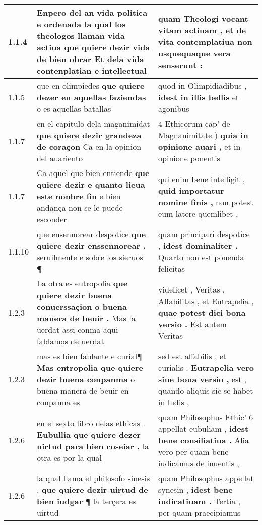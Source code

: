 \begin{tabular}{|p{1cm}|p{6.5cm}|p{6.5cm}|}

\hline
1.1.4 & Enpero del an vida politica e ordenada la qual los theologos llaman vida actiua \textbf{ que quiere dezir vida de bien obrar } Et dela vida contenplatian e intellectual & quam Theologi vocant vitam actiuam , \textbf{ et de vita contemplatiua } non usquequaque vera senserunt : \\\hline
1.1.5 & que en olimpiedes \textbf{ que quiere dezer en aquellas faziendas } o es aquellas batallas & quod in Olimpidiadibus , \textbf{ idest in illis bellis } et agonibus \\\hline
1.1.7 & en el capitulo dela maganimidat \textbf{ que quiere dezir grandeza de coraçon } Ca en la opinion del auariento & 4 Ethicorum cap’ de Magnanimitate ) \textbf{ quia in opinione auari , } et in opinione ponentis \\\hline
1.1.7 & Ca aquel que bien entiende \textbf{ que quiere dezir e quanto lieua este nonbre fin } e bien andança non se le puede esconder & qui enim bene intelligit , \textbf{ quid importatur nomine finis , } non potest eum latere quemlibet , \\\hline
1.1.10 & que ensennorear despotice \textbf{ que quiere dezir enssennorear . } seruilmente e sobre los sieruos ¶ & quam principari despotice , \textbf{ idest dominaliter . } Quarto non est ponenda felicitas \\\hline
1.2.3 & La otra es eutropolia \textbf{ que quiere dezir buena conuerssaçion o buena manera de beuir . } Mas la uerdat assi conma aqui fablamos de uerdat & videlicet , Veritas , Affabilitas , et Eutrapelia , \textbf{ quae potest dici bona versio . } Est autem Veritas \\\hline
1.2.3 & mas es bien fablante e curial¶ \textbf{ Mas entropolia que quiere dezir buena conpanma } o buena manera de beuir en conpanna es & sed est affabilis , et curialis . \textbf{ Eutrapelia vero siue bona versio , } est , quando aliquis sic se habet in ludis , \\\hline
1.2.6 & en el sexto libro delas ethicas . \textbf{ Eubullia que quiere dezer uirtud para bien coseiar . } la otra es por la qual & quam Philosophus Ethic’ 6 appellat eubuliam , \textbf{ idest bene consiliatiua . } Alia vero per quam bene iudicamus de inuentis , \\\hline
1.2.6 & la qual llama el philosofo sinesis . \textbf{ que quiere dezir uirtud de bien iudgar } ¶ la terçera es uirtud & quam Philosophus appellat synesin , \textbf{ idest bene iudicatiuam . } Tertia , per quam praecipiamus \\\hline

\end{tabular}
